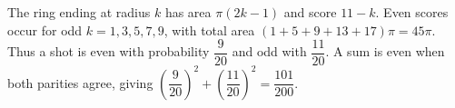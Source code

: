 The ring ending at radius $k$ has area $\pi(2k-1)$ and score $11-k$. Even scores occur for odd $k=1,3,5,7,9$, with total area $(1+5+9+13+17)\pi=45\pi$. Thus a shot is even with probability $\dfrac{9}{20}$ and odd with $\dfrac{11}{20}$. A sum is even when both parities agree, giving $(\dfrac{9}{20})^2+(\dfrac{11}{20})^2=\boxed{\dfrac{101}{200}}$.
